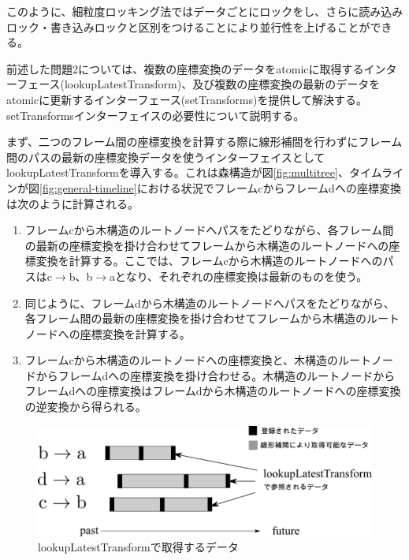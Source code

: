 \documentclass[a4paper]{jreport}	%
\begin{document}
このように、細粒度ロッキング法ではデータごとにロックをし、さらに読み込みロック・書き込みロックと区別をつけることにより並行性を上げることができる。


前述した問題2については、複数の座標変換のデータをatomicに取得するインターフェース(lookupLatestTransform)、及び複数の座標変換の最新のデータをatomicに更新するインターフェース(setTransforms)を提供して解決する。setTransformsインターフェイスの必要性について説明する。

まず、二つのフレーム間の座標変換を計算する際に線形補間を行わずにフレーム間のパスの最新の座標変換データを使うインターフェイスとしてlookupLatestTransformを導入する。これは森構造が図\ref{fig:multitree}、タイムラインが図\ref{fig:general-timeline}における状況でフレームcからフレームdへの座標変換は次のように計算される。

\begin{enumerate}
	\item フレームcから木構造のルートノードへパスをたどりながら、各フレーム間の最新の座標変換を掛け合わせてフレームから木構造のルートノードへの座標変換を計算する。ここでは、フレームcから木構造のルートノードへのパスはc$\rightarrow$b、b$\rightarrow$aとなり、それぞれの座標変換は最新のものを使う。
	\item 同じように、フレームdから木構造のルートノードへパスをたどりながら、各フレーム間の最新の座標変換を掛け合わせてフレームから木構造のルートノードへの座標変換を計算する。
	\item フレームcから木構造のルートノードへの座標変換と、木構造のルートノードからフレームdへの座標変換を掛け合わせる。木構造のルートノードからフレームdへの座標変換はフレームdから木構造のルートノードへの座標変換の逆変換から得られる。
\end{enumerate}

\begin{figure}[h] 
\centering
\includegraphics[width=12cm]{lookupLatestTransform}
\caption{lookupLatestTransformで取得するデータ}
\label{fig:lookupLatestTransform}
\end{figure}
\end{document}
